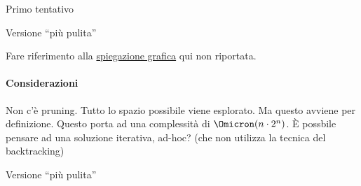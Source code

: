 \begin{minipage}[t]{.5\textwidth}
	\begin{algorithm}[H]
	\caption{Primo tentativo}


	\end{algorithm}
\end{minipage}%
\begin{minipage}[t]{.5\textwidth}
	\begin{algorithm}[H]
	\caption{Versione \enquote{più pulita}}

    \vspace{-0.85pt}
	\end{algorithm}
\end{minipage}

Fare riferimento alla \href{https://youtu.be/00hO1skHCls?t=1420}{spiegazione grafica} qui non riportata.

\paragraph{Considerazioni}
Non c'è pruning.
Tutto lo spazio possibile viene esplorato.
Ma questo avviene per definizione.
Questo porta ad una complessità di \(\Omicron(n \cdot 2^n)\).
\`{E} possbile pensare ad una soluzione iterativa, ad-hoc? (che non utilizza la tecnica del backtracking)

\begin{algorithm}[H]
\caption{Versione \enquote{più pulita}}


\end{algorithm}

